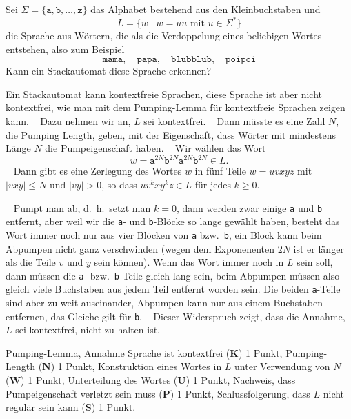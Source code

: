Sei $\Sigma=\{\texttt{a},\texttt{b},\dots,\texttt{z}\}$ das Alphabet
bestehend aus den Kleinbuchstaben und 
\[
L=\{ w\;|\; \text{$w=uu$ mit $u\in\Sigma^*$}\}
\]
die Sprache aus Wörtern, die als die Verdoppelung eines beliebigen
Wortes entstehen, also zum Beispiel
\[
\texttt{mama},\quad
\texttt{papa},\quad
\texttt{blubblub},\quad
\texttt{poipoi}
\]
Kann ein Stackautomat diese Sprache erkennen?





\begin{loesung}
Ein Stackautomat kann kontextfreie Sprachen, diese Sprache ist aber nicht
kontextfrei, wie man mit dem Pumping-Lemma für kontextfreie
Sprachen zeigen kann.
~%
Dazu nehmen wir an, $L$ sei kontextfrei.
~%
Dann müsste es eine Zahl $N$, die Pumping Length, geben, mit der Eigenschaft,
dass Wörter mit mindestens Länge $N$ die Pumpeigenschaft haben.
~%
Wir wählen das Wort
\[
w=
\texttt{a}^{2N}
\texttt{b}^{2N}
\texttt{a}^{2N}
\texttt{b}^{2N}
\in L.
\]
~%
Dann gibt es eine Zerlegung des Wortes $w$ in fünf Teile $w=uvxyz$ mit
$|vxy|\le N$ und $|vy|>0$, so dass $uv^kxy^kz\in L$ für jedes $k\ge 0$.

~%
Pumpt man ab, d.~h.~setzt man $k=0$, dann werden zwar einige \texttt{a}
und \texttt{b} entfernt, aber weil wir die \texttt{a}- und \texttt{b}-Blöcke
so lange gewählt haben, besteht das Wort immer noch nur aus
vier Blöcken von \texttt{a} bzw.~\texttt{b}, ein Block kann beim
Abpumpen nicht ganz verschwinden (wegen dem Exponenenten $2N$ ist er
länger als die Teile $v$ und $y$ sein können).
Wenn das Wort immer noch in $L$ sein soll, dann müssen die \texttt{a}-
bzw.~\texttt{b}-Teile gleich lang sein, beim Abpumpen müssen also
gleich viele Buchstaben aus jedem Teil entfernt worden sein.
Die beiden \texttt{a}-Teile sind aber zu weit auseinander, Abpumpen
kann nur aus einem Buchstaben entfernen, das Gleiche gilt für \texttt{b}.
~%
Dieser Widerspruch zeigt, dass die Annahme, $L$ sei kontextfrei, nicht
zu halten ist.
\end{loesung}

\begin{bewertung}
Pumping-Lemma, Annahme Sprache ist kontextfrei ({\bf K}) 1 Punkt,
Pumping-Length ({\bf N}) 1 Punkt,
Konstruktion eines Wortes in $L$ unter Verwendung von $N$ ({\bf W}) 1 Punkt,
Unterteilung des Wortes ({\bf U}) 1 Punkt,
Nachweis, dass Pumpeigenschaft verletzt sein muss ({\bf P}) 1 Punkt,
Schlussfolgerung, dass $L$ nicht regulär sein kann ({\bf S}) 1 Punkt.
\end{bewertung}




